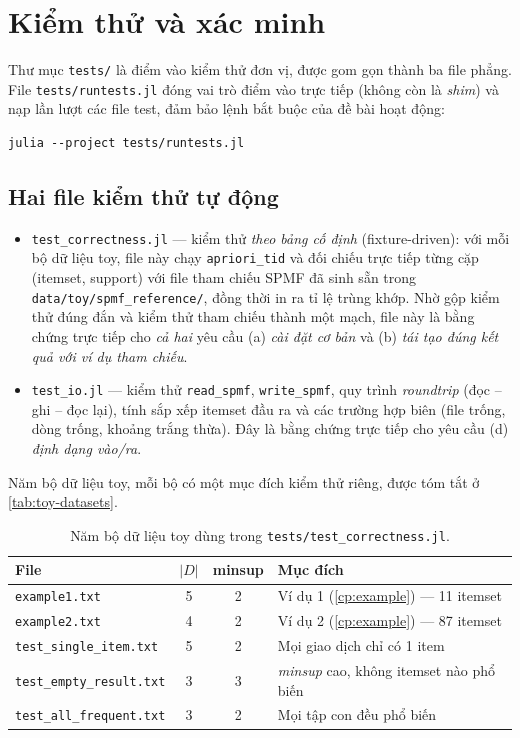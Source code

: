 \section{Kiểm thử và xác minh}
\label{sec:impl-tests}

Thư mục \texttt{tests/} là điểm vào kiểm thử đơn vị, được gom gọn thành ba file phẳng. File \texttt{tests/runtests.jl} đóng vai trò điểm vào trực tiếp (không còn là \emph{shim}) và nạp lần lượt các file test, đảm bảo lệnh bắt buộc của đề bài hoạt động:

\begin{verbatim}
julia --project tests/runtests.jl
\end{verbatim}

\subsection{Hai file kiểm thử tự động}

\begin{itemize}
    \item \texttt{test\_correctness.jl} --- kiểm thử \emph{theo bảng cố định} (fixture-driven): với mỗi bộ dữ liệu toy, file này chạy \texttt{apriori\_tid} và đối chiếu trực tiếp từng cặp (itemset, support) với file tham chiếu SPMF đã sinh sẵn trong \texttt{data/toy/spmf\_reference/}, đồng thời in ra tỉ lệ trùng khớp. Nhờ gộp kiểm thử đúng đắn và kiểm thử tham chiếu thành một mạch, file này là bằng chứng trực tiếp cho \emph{cả hai} yêu cầu (a) \emph{cài đặt cơ bản} và (b) \emph{tái tạo đúng kết quả với ví dụ tham chiếu}.
    \item \texttt{test\_io.jl} --- kiểm thử \texttt{read\_spmf}, \texttt{write\_spmf}, quy trình \emph{roundtrip} (đọc -- ghi -- đọc lại), tính sắp xếp itemset đầu ra và các trường hợp biên (file trống, dòng trống, khoảng trắng thừa). Đây là bằng chứng trực tiếp cho yêu cầu (d) \emph{định dạng vào/ra}.
\end{itemize}

Năm bộ dữ liệu toy, mỗi bộ có một mục đích kiểm thử riêng, được tóm tắt ở \autoref{tab:toy-datasets}.

\begin{table}[htbp]
    \centering
    \caption{Năm bộ dữ liệu toy dùng trong \texttt{tests/test\_correctness.jl}.}
    \label{tab:toy-datasets}
    \begin{tabular}{l|c|c|l}
        \hline
        \textbf{File} & $|D|$ & \textbf{minsup} & \textbf{Mục đích} \\ \hline
        \texttt{example1.txt}          & 5 & 2 & Ví dụ 1 (\autoref{cp:example}) --- 11 itemset \\
        \texttt{example2.txt}          & 4 & 2 & Ví dụ 2 (\autoref{cp:example}) --- 87 itemset \\
        \texttt{test\_single\_item.txt} & 5 & 2 & Mọi giao dịch chỉ có 1 item \\
        \texttt{test\_empty\_result.txt}& 3 & 3 & \textit{minsup} cao, không itemset nào phổ biến \\
        \texttt{test\_all\_frequent.txt}& 3 & 2 & Mọi tập con đều phổ biến \\
        \hline
    \end{tabular}
\end{table}

